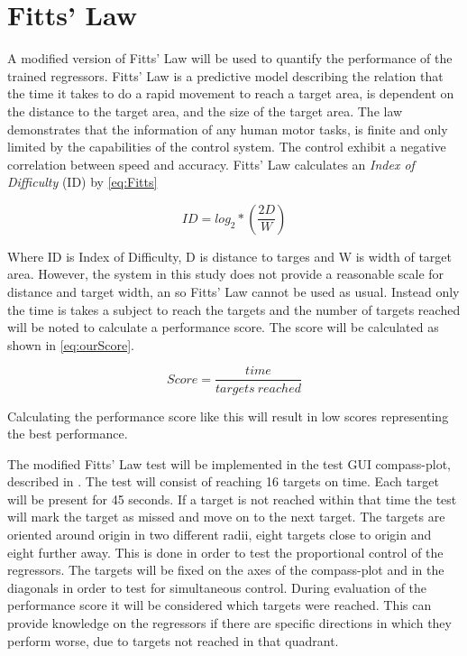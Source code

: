 \section{Fitts' Law}

A modified version of Fitts' Law will be used to quantify the performance of the trained regressors. Fitts' Law is a predictive model describing the relation that the time it takes to do a rapid movement to reach a target area, is dependent on the distance to the target area, and the size of the target area. The law demonstrates that the information of any human motor tasks, is finite and only limited by the capabilities of the control system. The control exhibit a negative correlation between speed and accuracy. \cite{Kamavuako2014}
Fitts' Law calculates an \textit{Index of Difficulty} (ID) by \eqref{eq:Fitts}

\begin{equation} \label{eq:Fitts}
ID = log_{2} * (\frac{2D}{W})
\end{equation}

Where ID is Index of Difficulty, D is distance to targes and W is width of target area. However, the system in this study does not provide a reasonable scale for distance and target width, an so Fitts' Law cannot be used as usual. Instead only the time is takes a subject to reach the targets and the number of targets reached will be noted to calculate a performance score. The score will be calculated as shown in \eqref{eq:ourScore}.

\begin{equation} \label{eq:ourScore}
	Score = \frac{time}{targets\ reached}
\end{equation}

Calculating the performance score like this will result in low scores representing the best performance.

The modified Fitts' Law test will be implemented in the test GUI compass-plot, described in . The test will consist of reaching 16 targets on time. Each target will be present for 45 seconds. If a target is not reached within that time the test will mark the target as missed and move on to the next target. The targets are oriented around origin in two different radii, eight targets close to origin and eight further away. This is done in order to test the proportional control of the regressors. The targets will be fixed on the axes of the compass-plot and in the diagonals in order to test for simultaneous control. 
During evaluation of the performance score it will be considered which targets were reached. This can provide knowledge on the regressors if there are specific directions in which they perform worse, due to targets not reached in that quadrant. 


